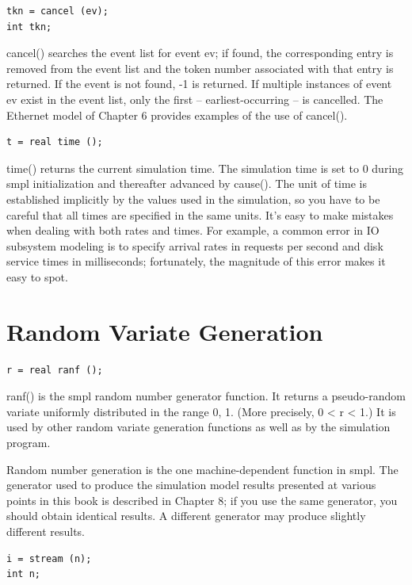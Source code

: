 \begin{verbatim}
tkn = cancel (ev);
int tkn;
\end{verbatim}

cancel() searches the event list for event ev; if found, the corresponding
entry is removed from the event list and the token number associated
\noindent with that entry is returned. If the event is not found, -1 is returned. If multiple
instances of event ev exist in the event list, only the first --
earliest-occurring -- is cancelled. The Ethernet model of Chapter 6 provides
examples of the use of cancel().

\begin{verbatim}
t = real time ();
\end{verbatim}

time() returns the current simulation time. The simulation time is set to 0
during smpl initialization and thereafter advanced by cause(). The unit of
time is established implicitly by the values used in the simulation, so you
have to be careful that all times are specified in the same units. It's easy to
make mistakes when dealing with both rates and times. For example, a common
error in IO subsystem modeling is to specify arrival rates in requests per
second and disk service times in milliseconds; fortunately, the magnitude of
this error makes it easy to spot.

\section{Random Variate Generation}
\label{sec:smpl-random-variate-generation}

\begin{verbatim}
r = real ranf ();
\end{verbatim}

ranf() is the smpl random number generator function. It returns a
pseudo-random variate uniformly distributed in the range 0, 1. (More
precisely, 0 < r < 1.) It is used by other random variate generation functions
as well as by the simulation program.

Random number generation is the one machine-dependent function in smpl. The
generator used to produce the simulation model results presented at various
points in this book is described in Chapter 8; if you use the same generator,
you should obtain identical results. A different generator may produce
slightly different results.

\begin{verbatim}
i = stream (n);
int n;
\end{verbatim}

